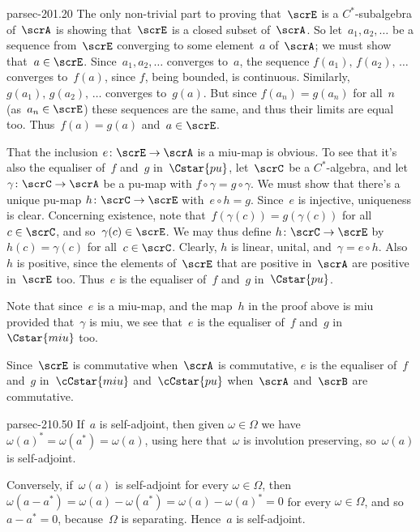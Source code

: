 \documentclass[b5page]{book}
\begin{document}
\begin{solution}{parsec-201.20}
The only non-trivial part to proving that~$\scrE$
is a $C^*$-subalgebra of~$\scrA$ is
showing that~$\scrE$ is a closed subset of~$\scrA$.
So let~$a_1,a_2,\dotsc$ be a sequence from~$\scrE$
converging to some element~$a$ of~$\scrA$;
we must show that~$a\in \scrE$.
Since~$a_1,a_2,\dotsc$ converges to~$a$,
    the sequence $f(a_1),\,f(a_2),\,\dotsc$
    converges to~$f(a)$,
since $f$, being bounded, is continuous.
    Similarly, $g(a_1),\,g(a_2),\,\dotsc$
    converges to~$g(a)$.
But since  $f(a_n)=g(a_n)$
    for all~$n$ (as~$a_n\in\scrE$)
these sequences
    are the same, and thus their
    limits are equal too.  Thus~$f(a)=g(a)$ and~$a\in\scrE$.

That the inclusion $e\colon \scrE\to\scrA$
is a miu-map is obvious. To see that it's also the equaliser
    of~$f$ and~$g$ in~$\Cstar{pu}$, let~$\scrC$ be a $C^*$-algebra,
and let $\gamma\colon \scrC\to\scrA$ be a pu-map with
$f\circ \gamma = g\circ \gamma$.
We must show that there's a unique pu-map $h\colon \scrC\to\scrE$
with~$e\circ h = g$.
Since~$e$ is injective, uniqueness is clear.
Concerning existence, note
that~$f(\gamma(c))=g(\gamma(c))$
for all~$c\in\scrC$,
and so~$\gamma(c)\in\scrE$.
We may thus define $h\colon \scrC\to\scrE$ by
$h(c)=\gamma(c)$ for all~$c\in\scrC$.
Clearly, $h$ is linear, unital, and~$\gamma=e\circ h$.
Also~$h$ is positive, 
since the elements of~$\scrE$ that are positive in~$\scrA$
are positive in~$\scrE$ too.
    Thus~$e$ is the equaliser of~$f$ and~$g$ in~$\Cstar{pu}$.

Note that since~$e$ is a miu-map,
and the map~$h$ in the proof above is miu provided that~$\gamma$
is miu,
    we see that~$e$ is the equaliser of~$f$ and~$g$ in~$\Cstar{miu}$ too.

Since~$\scrE$ is commutative when~$\scrA$ is commutative,
    $e$ is the equaliser of~$f$ and~$g$ in~$\cCstar{miu}$
    and~$\cCstar{pu}$
    when~$\scrA$ and~$\scrB$ are commutative.
\end{solution}
\begin{solution}{parsec-210.50}
If~$a$ is self-adjoint,
then given $\omega\in\Omega$
we have~$\omega(a)^* = \omega(a^*)=\omega(a)$,
using here that~$\omega$ is involution preserving,
    so~$\omega(a)$ is self-adjoint.

    Conversely,
    if~$\omega(a)$ is self-adjoint for every $\omega\in\Omega$,
then $\omega(a-a^*)=\omega(a)-\omega(a^*)=
    \omega(a)-\omega(a)^*=0$ for every $\omega\in\Omega$,
    and so~$a-a^*=0$, because~$\Omega$ is separating.
    Hence~$a$ is self-adjoint.
\end{solution}
\end{document}
